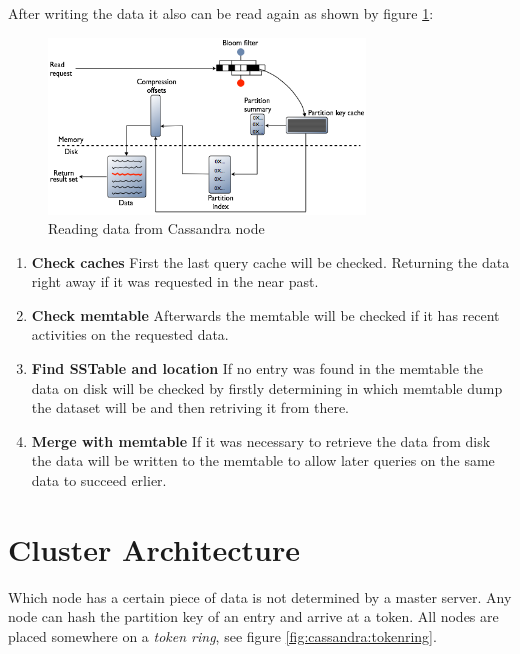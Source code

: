 After writing the data it also can be read again as shown by figure \ref{fig:cassandra:readData}:
\begin{figure}[ht]
    \centering
    \includegraphics[width=0.75\textwidth]{img/cassandra_local_read.png}
    \caption{Reading data from Cassandra node \autocite{datastaxReadData}}
    \label{fig:cassandra:readData}
\end{figure}
\begin{enumerate}
    \item \textbf{Check caches} First the last query cache will be checked. Returning the data right away if it was requested in the near past.
    \item \textbf{Check memtable} Afterwards the memtable will be checked if it has recent activities on the requested data.
    \item \textbf{Find SSTable and location} If no entry was found in the memtable the data on disk will be checked by firstly determining in which memtable dump the dataset will be and then retriving it from there.
    \item \textbf{Merge with memtable} If it was necessary to retrieve the data from disk the data will be written to the memtable to allow later queries on the same data to succeed erlier.
\end{enumerate}

\section{Cluster Architecture}\label{sec:CassandraClusterArchitecture}  %
Which node has a certain piece of data is not determined by a master server. Any node can hash the partition key of an entry and arrive at a token. All nodes are placed somewhere on a \textit{token ring}, see figure \ref{fig:cassandra:tokenring}.

